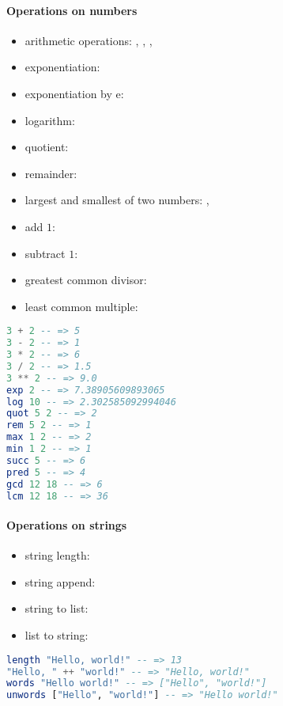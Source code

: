 \documentclass[a4paper,landscape,10pt]{article}
\begin{document}
\begin{multicols*}{2}
  \breakcolumn

  \paragraph{Operations on numbers}

  \begin{itemize}
    \item arithmetic operations: \ihaskell{+}, \ihaskell{-}, \ihaskell{*}, \ihaskell{/}
    \item exponentiation: \ihaskell{**}
    \item exponentiation by e: 
    \item logarithm: 
    \item quotient: 
    \item remainder: 
    \item largest and smallest of two numbers: , 
    \item add \(1\): 
    \item subtract \(1\): 
    \item greatest common divisor: 
    \item least common multiple: 
  \end{itemize}

  \begin{lstlisting}[language=Haskell]
3 + 2 -- => 5
3 - 2 -- => 1
3 * 2 -- => 6
3 / 2 -- => 1.5
3 ** 2 -- => 9.0
exp 2 -- => 7.38905609893065
log 10 -- => 2.302585092994046
quot 5 2 -- => 2
rem 5 2 -- => 1
max 1 2 -- => 2
min 1 2 -- => 1
succ 5 -- => 6
pred 5 -- => 4
gcd 12 18 -- => 6
lcm 12 18 -- => 36
\end{lstlisting}

  \paragraph{Operations on strings}

  \begin{itemize}
    \item string length: 
    \item string append: \ihaskell{++}
    \item string to list: 
    \item list to string: 
  \end{itemize}

  \begin{lstlisting}[language=Haskell]
length "Hello, world!" -- => 13
"Hello, " ++ "world!" -- => "Hello, world!"
words "Hello world!" -- => ["Hello", "world!"]
unwords ["Hello", "world!"] -- => "Hello world!"
\end{lstlisting}


\end{multicols*}
\end{document}
